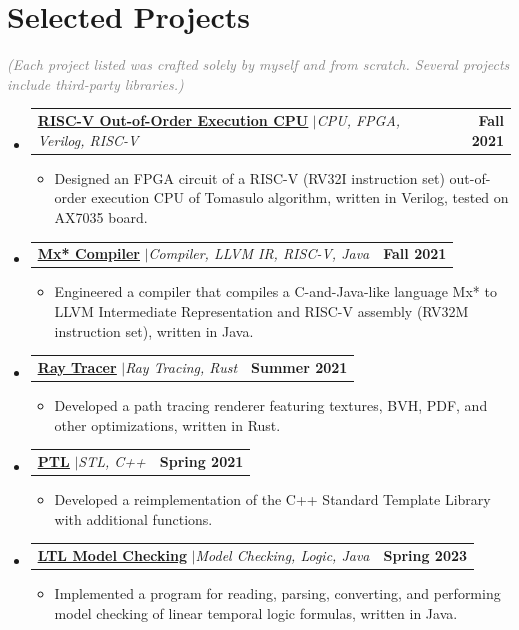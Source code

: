 \documentclass[letterpaper,11pt]{article}
\makeatletter
\newcommand{\resumeItem}[1]{
  \item\small{
    {#1 \vspace{-2pt}}
  }
}
\newcommand{\resumeProjectHeading}[2]{
    \item
    \begin{tabular*}{1.001\textwidth}{l@{\extracolsep{\fill}}r}
      \small#1 & \textbf{\small #2}\\
    \end{tabular*}\vspace{-5pt}
}
\newcommand{\resumeSubHeadingListStart}{\begin{itemize}[leftmargin=0.0in, label={}]}
\newcommand{\resumeSubHeadingListEnd}{\end{itemize}}
\newcommand{\resumeItemListStart}{\begin{itemize}}
\newcommand{\resumeItemListEnd}{\end{itemize}\vspace{4pt}}
\newcommand{\grayunderline}[1]{\setulcolor{lightgray}\setul{0.5ex}{0.1pt}\ul{#1}}
\makeatother
\begin{document}
\section{Selected Projects}
    \vspace{-3pt}
    \small\textcolor{gray}{\textit{(Each project listed was crafted solely by myself and from scratch. Several projects include third-party libraries.)}}
    \vspace{-10pt}
    \resumeSubHeadingListStart
        \resumeProjectHeading
            {\href{https://github.com/PaperL/RISC-V_CPU}{\grayunderline{\textbf{RISC-V Out-of-Order Execution CPU}}}
            \enspace$|$\enspace\emph{CPU, FPGA, Verilog, RISC-V}}{Fall 2021}
            \resumeItemListStart
                \resumeItem{Designed an FPGA circuit of a RISC-V (RV32I instruction set) out-of-order execution CPU of Tomasulo algorithm, written in Verilog, tested on AX7035 board.}
            \resumeItemListEnd
            \vspace{-10pt}
        \resumeProjectHeading
            {\href{https://github.com/PaperL/Mxx-Compiler}{\grayunderline{\textbf{Mx* Compiler}}}
            \enspace$|$\enspace\emph{Compiler, LLVM IR, RISC-V, Java}}{Fall 2021}
            \resumeItemListStart
                \resumeItem{Engineered a compiler that compiles a C-and-Java-like language Mx* to LLVM Intermediate Representation and RISC-V assembly (RV32M instruction set), written in Java.}
            \resumeItemListEnd
            \vspace{-10pt}
        \resumeProjectHeading
            {\href{https://github.com/PaperL/Toy_Ray_Tracer}{\grayunderline{\textbf{Ray Tracer}}}
            \enspace$|$\enspace\emph{Ray Tracing, Rust}}{Summer 2021}
            \resumeItemListStart
                \resumeItem{Developed a path tracing renderer featuring textures, BVH, PDF, and other optimizations, written in Rust.}
            \resumeItemListEnd
            \newpage
        \resumeProjectHeading
            {\href{https://github.com/PaperL/PTL}{\grayunderline{\textbf{PTL}}}
            \enspace$|$\enspace\emph{STL, C++}}{Spring 2021}
            \resumeItemListStart
                \resumeItem{Developed a reimplementation of the C++ Standard Template Library with additional functions.}
            \resumeItemListEnd
            \vspace{-10pt}
        \resumeProjectHeading
            {\href{https://github.com/PaperL/LTL_Model_Checking_Project}{\grayunderline{\textbf{LTL Model Checking}}}
            \enspace$|$\enspace\emph{Model Checking, Logic, Java}}{Spring 2023}
            \resumeItemListStart
                \resumeItem{Implemented a program for reading, parsing, converting, and performing model checking of linear temporal logic formulas, written in Java.}
            \resumeItemListEnd
            \vspace{-10pt}
    \resumeSubHeadingListEnd
\vspace{-4pt}
\end{document}
